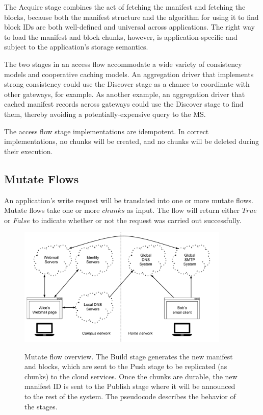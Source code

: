 The Acquire stage combines the act of fetching the manifest and fetching the
blocks, because both the manifest structure and the algorithm for using it to
find block IDs are both well-defined and universal across applications.  The 
right way to load the manifest and block chunks, however, is
application-specific and subject to the application's storage semantics.

The two stages in an access flow accommodate a wide
variety of consistency models and cooperative caching models.  An
aggregation driver that implements strong consistency could use the Discover
stage as a chance to coordinate with other gateways, for example.  As
another example, an aggregation driver that cached manifest records
across gateways could use the Discover stage to find them, thereby avoiding a
potentially-expensive query to the MS.

The access flow stage implementations are idempotent.  In correct
implementations, no chunks will be created, and no chunks will be deleted
during their execution.

\subsection{Mutate Flows}

An application's write request will be translated into one or more mutate flows.
Mutate flows take one or more $chunks$ as input.  The flow will return
either $True$ or $False$ to indicate whether or not the request was
carried out successfully.

\begin{figure}[h]
   \caption{Mutate flow overview.  The Build stage generates the new manifest
   and blocks, which are sent to the Push stage to be replicated (as chunks) to
   the cloud services.  Once the chunks are durable, the new manifest ID is
   sent to the Publish stage where it will be announced to the rest of the
   system.  The pseudocode describes the behavior of the stages.}
   \centering
   \includegraphics[width=0.9\textwidth,page=8]{figures/dissertation-figures}
   \label{fig:chap2-mutate-flow}
\end{figure}

